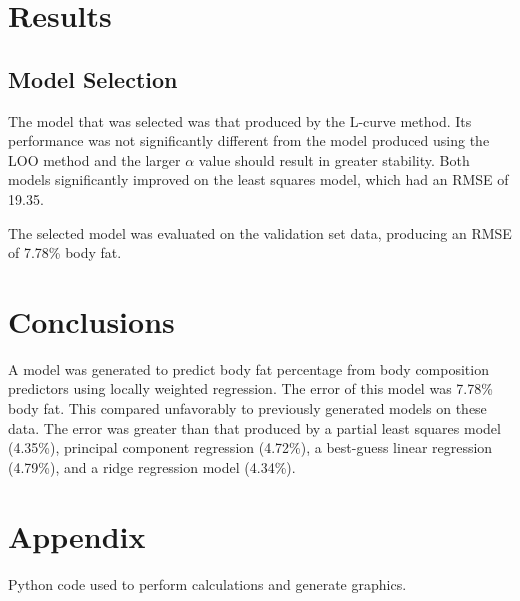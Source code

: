 \documentclass{IEEEtran}
\begin{document}
\section{Results}

\begin{table}[h]

\end{table}

\subsection{Model Selection}
The model that was selected was that produced by the L-curve method. Its performance was not significantly 
different from the model produced using the LOO method and the larger $\alpha$ value should result in greater 
stability. Both models significantly improved on the least squares model, which had an RMSE of \num{19.35}.

The selected model was evaluated on the validation set data, producing an RMSE of \num{7.78}\% body fat.
\section{Conclusions}

A model was generated to predict body fat percentage from body composition predictors using locally weighted regression. The error of this model was \num{7.78}\% body fat. This compared unfavorably to previously generated models on these data. The error was greater than that produced by a partial least squares model (\num{4.35}\%), principal component regression (\num{4.72}\%), a best-guess linear regression (\num{4.79}\%), and a ridge regression model (\num{4.34}\%). 

\printbibliography

\onecolumn
\section{Appendix}
Python code used to perform calculations and generate graphics.
\lstset{frame=single}

\end{document}
